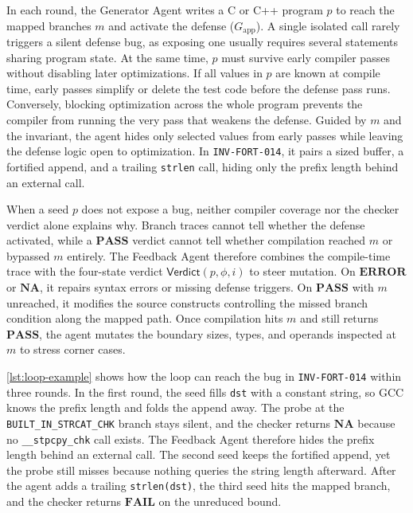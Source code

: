 \documentclass[conference,compsoc]{IEEEtran}
\begin{document}
In each round, the Generator Agent writes a C or C++ program $p$ to reach the mapped branches $m$ and activate the defense ($G_{\text{app}}$). A single isolated call rarely triggers a silent defense bug, as exposing one usually requires several statements sharing program state. At the same time, $p$ must survive early compiler passes without disabling later optimizations. If all values in $p$ are known at compile time, early passes simplify or delete the test code before the defense pass runs. Conversely, blocking optimization across the whole program prevents the compiler from running the very pass that weakens the defense. Guided by $m$ and the invariant, the agent hides only selected values from early passes while leaving the defense logic open to optimization. In \texttt{INV-FORT-014}, it pairs a sized buffer, a fortified append, and a trailing \texttt{strlen} call, hiding only the prefix length behind an external call.

When a seed $p$ does not expose a bug, neither compiler coverage nor the checker verdict alone explains why. Branch traces cannot tell whether the defense activated, while a $\mathbf{PASS}$ verdict cannot tell whether compilation reached $m$ or bypassed $m$ entirely. The Feedback Agent therefore combines the compile-time trace with the four-state verdict $\mathsf{Verdict}(p, \phi, i)$ to steer mutation. On $\mathbf{ERROR}$ or $\mathbf{NA}$, it repairs syntax errors or missing defense triggers. On $\mathbf{PASS}$ with $m$ unreached, it modifies the source constructs controlling the missed branch condition along the mapped path. Once compilation hits $m$ and still returns $\mathbf{PASS}$, the agent mutates the boundary sizes, types, and operands inspected at $m$ to stress corner cases.

\autoref{lst:loop-example} shows how the loop can reach the bug in \texttt{INV-FORT-014} within three rounds. In the first round, the seed fills \texttt{dst} with a constant string, so GCC knows the prefix length and folds the append away. The probe at the \texttt{BUILT\_IN\_STRCAT\_CHK} branch stays silent, and the checker returns $\mathbf{NA}$ because no \texttt{\_\_stpcpy\_chk} call exists. The Feedback Agent therefore hides the prefix length behind an external call. The second seed keeps the fortified append, yet the probe still misses because nothing queries the string length afterward. After the agent adds a trailing \texttt{strlen(dst)}, the third seed hits the mapped branch, and the checker returns $\mathbf{FAIL}$ on the unreduced bound.
\end{document}
